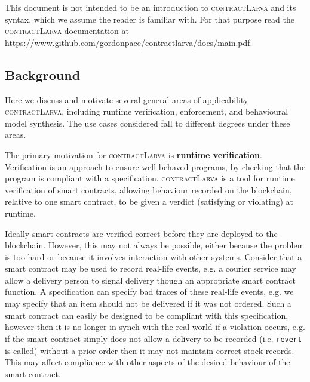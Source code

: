 \documentclass{article}
\newcommand{\contractlarva}{\textsc{contractLarva}\xspace}
\begin{document}
 This document is not intended to be an introduction to \contractlarva and its syntax, which we assume the reader is familiar with. For that purpose read the \contractlarva documentation at \url{https://www.github.com/gordonpace/contractlarva/docs/main.pdf}. 


  \subsection{Background}
  
  Here we discuss and motivate several general areas of applicability \contractlarva, including runtime verification, enforcement, and behavioural model synthesis. The use cases considered fall to different degrees under these areas.


  The primary motivation for \contractlarva is \textbf{runtime verification}. Verification is an approach to ensure well-behaved programs, by checking that the program is compliant with a specification. \contractlarva is a tool for runtime verification of smart contracts, allowing behaviour recorded on the blockchain, relative to one smart contract, to be given a verdict (satisfying or violating) at runtime. 
  
  Ideally smart contracts are verified correct before they are deployed to the blockchain. However, this may not always be possible, either because the problem is too hard or because it involves interaction with other systems. Consider that a smart contract may be used to record real-life events, e.g. a courier service may allow a delivery person to signal delivery though an appropriate smart contract function. A specification can specify bad traces of these real-life events, e.g. we may specify that an item should not be delivered if it was not ordered. Such a smart contract can easily be designed to be compliant with this specification, however then it is no longer in synch with the real-world if a violation occurs, e.g. if the smart contract simply does not allow a delivery to be recorded (i.e. \texttt{revert} is called) without a prior order then it may not maintain correct stock records. This may affect compliance with other aspects of the desired behaviour of the smart contract. 
  
\end{document}
